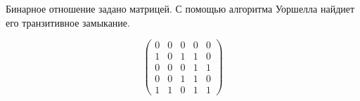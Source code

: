 
\renewcommand*{\proofname}{Решение}

\begin{problem}[1]
	Бинарное отношение задано матрицей. С помощью алгоритма Уоршелла найдиет его транзитивное замыкание.
    \par

    \[\begin{pmatrix}
        0 & 0 & 0 & 0 & 0\\
        1 & 0 & 1 & 1 & 0\\
        0 & 0 & 0 & 1 & 1\\
        0 & 0 & 1 & 1 & 0\\
        1 & 1 & 0 & 1 & 1
    \end{pmatrix}\]
    
\end{problem}

